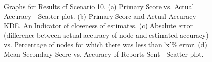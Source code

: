 \documentclass[journal]{IEEEtran}
\begin{document}
\begin{figure}[!ht]
{}
\end{figure}
\begin{figure}[!ht]
\caption{Graphs for Results of Scenario 10. (a) Primary Score vs. Actual Accuracy - Scatter plot. (b) Primary Score and Actual Accuracy KDE. An Indicator of closeness of estimates. (c) Absolute error (difference between actual accuracy of node and estimated accuracy) vs. Percentage of nodes for which there was less than 'x'\% error. (d) Mean Secondary Score vs. Accuracy of Reports Sent - Scatter plot.}
\label{fig:apdx:sc10}
\centering
{}
\end{figure}
\end{document}

